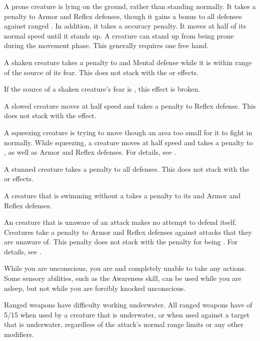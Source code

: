      A prone creature is lying on the ground, rather than standing normally.
    It takes a  penalty to Armor and Reflex defenses, though it gains a  bonus to all defenses against ranged .
    In addition, it takes a  accuracy penalty.
    It moves at half of its normal speed until it stands up.
    A creature can stand up from being prone during the movement phase.
    This generally requires one free hand.

     A shaken creature takes a  penalty to  and Mental defense while it is within \rngmed range of the source of its fear.
    This does not stack with the \frightened or \panicked effects.

    If the source of a shaken creature's fear is , this effect is broken.

     A slowed creature moves at half speed and takes a  penalty to Reflex defense.
    This does not stack with the \immobilized effect.

     A squeezing creature is trying to move though an area too small for it to fight in normally.
    While squeezing, a creature moves at half speed and takes a  penalty to , as well as Armor and Reflex defenses.
    For details, see .

     A stunned creature takes a  penalty to all defenses.
    This does not stack with the \dazed or \confused effects.

     A creature that is swimming without a  takes a  penalty to its  and Armor and Reflex defenses.

     An creature that is unaware of an attack makes no attempt to defend itself.
    Creatures take a  penalty to Armor and Reflex defenses against attacks that they are unaware of.
    This penalty does not stack with the penalty for being \partiallyunaware.
    For details, see .

     While you are unconscious, you are \helpless and completely unable to take any actions.
    Some sensory abilities, such as the Awareness skill, can be used while you are asleep, but not while you are forcibly knocked unconscious.

     Ranged weapons have difficulty working underwater.
    All ranged weapons have  of 5/15 when used by a creature that is underwater, or when used against a target that is underwater, regardless of the attack's normal range limits or any other modifiers.

